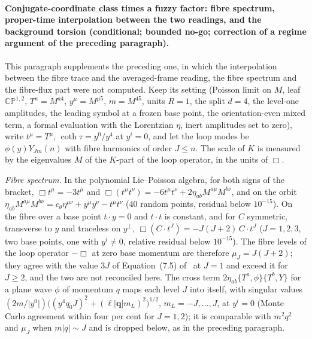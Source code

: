 \paragraph{Conjugate-coordinate class times a fuzzy factor: fibre spectrum, proper-time interpolation between the two readings, and the background torsion (conditional; bounded no-go; correction of a regime argument of the preceding paragraph).}
This paragraph supplements the preceding one, in which the interpolation between the fibre trace and the averaged-frame reading, the fibre spectrum and the fibre-flux part were not computed. Keep its setting (Poisson limit on \(M\), leaf \(\mathbb{CP}^{1,2}\), \(T^a=M^{a4}\), \(y^\mu=M^{\mu5}\), \(m=M^{45}\), units \(R=1\), the split \(d=4\), the level-one amplitudes, the leading symbol at a frozen base point, the orientation-even mixed term, a formal evaluation with the Lorentzian \(\eta\), inert amplitudes set to zero), write \(t^\mu=T^\mu\), \(\coth\tau=y^0/y^4\) at \(y^i=0\), and let the loop modes be \(\phi(y)Y_{Jm}(n)\) with fibre harmonics of order \(J\le n\). The scale of \(K\) is measured by the eigenvalues \(M\) of the \(K\)-part of the loop operator, in the units of \(\Box\).

\emph{Fibre spectrum.} In the polynomial Lie--Poisson algebra, for both signs of the bracket, \(\Box t^\mu=-3t^\mu\) and \(\Box(t^\mu t^\nu)=-6t^\mu t^\nu+2\eta_{ab}M^{a\mu}M^{b\nu}\), and on the orbit \(\eta_{ab}M^{a\mu}M^{b\nu}=c_\theta\eta^{\mu\nu}+y^\mu y^\nu-t^\mu t^\nu\) (\(40\) random points, residual below \(10^{-15}\)). On the fibre over a base point \(t\cdot y=0\) and \(t\cdot t\) is constant, and for \(C\) symmetric, transverse to \(y\) and traceless on \(y^\perp\), \(\Box(C\cdot t^J)=-J(J+2)\,C\cdot t^J\) (\(J=1,2,3\), two base points, one with \(y^i\neq0\), relative residual below \(10^{-15}\)). The fibre levels of the loop operator \(-\Box\) at zero base momentum are therefore \(\mu_J=J(J+2)\); they agree with the value \(3J\) of Equation~(7.5) of~\cite{Steinacker2023} at \(J=1\) and exceed it for \(J\ge2\), and the two are not reconciled here. The cross term \(2\eta_{ab}\{T^a,\phi\}\{T^b,Y\}\) for a plane wave \(\phi\) of momentum \(q\) maps each level \(J\) into itself, with singular values \((2m/\lvert y^0\rvert)\bigl((y^4q_0J)^2+(\ell\lvert\mathbf q\rvert m_L)^2\bigr)^{1/2}\), \(m_L=-J,\dots,J\), at \(y^i=0\) (Monte Carlo agreement within four per cent for \(J=1,2\)); it is comparable with \(m^2q^2\) and \(\mu_J\) when \(m\lvert q\rvert\sim J\) and is dropped below, as in the preceding paragraph.


